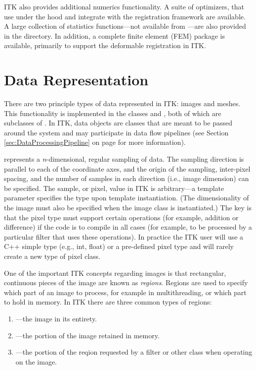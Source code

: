 ITK also provides additional numerics functionality. A suite of optimizers, that
use  under the hood and integrate with the registration framework
are available. A large collection of statistics functions---not available from
---are also provided in the 
directory. In addition, a complete finite element (FEM) package is available,
primarily to support the deformable registration in ITK.


\section{Data Representation}
\label{sec:DataRepresentationAndAccess}


There are two principle types of data represented in ITK: images and
meshes. This functionality is implemented in the classes 
 and , both of which are subclasses of
. In ITK, data objects are classes that are meant to
be passed around the system and may participate in data flow pipelines
(see Section \ref{sec:DataProcessingPipeline} on page 
\pageref{sec:DataProcessingPipeline} for more information). 



 represents a \emph{n}-dimensional, regular sampling of
data. The sampling direction is parallel to each of the coordinate axes, and
the origin of the sampling, inter-pixel spacing, and the number of samples in
each direction (i.e., image dimension) can be specified. The sample, or
pixel, value in ITK is arbitrary---a template parameter 
specifies the type upon template instantiation. (The dimensionality of the
image must also be specified when the image class is instantiated.) The key
is that the pixel type must support certain operations (for example, addition
or difference) if the code is to compile in all cases (for example, to be
processed by a particular filter that uses these operations). In practice the
ITK user will use a C++ simple type (e.g., int, float) or a pre-defined pixel
type and will rarely create a new type of pixel class.

One of the important ITK concepts regarding images is that rectangular,
continuous pieces of the image are known as \emph{regions}. Regions are used
to specify which part of an image to process, for example in multithreading,
or which part to hold in memory. In ITK there are three common types of
regions:
\begin{enumerate}
\item {}---the image in its entirety.
\item {}---the portion of the image retained in memory.
\item {}---the portion of the reqion requested by a 
filter or other class when operating on the image.
\end{enumerate}


